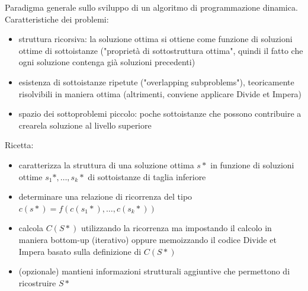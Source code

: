 Paradigma generale sullo sviluppo di un algoritmo di programmazione dinamica. Caratteristiche dei problemi:
\begin{itemize}
    \item struttura ricorsiva: la soluzione ottima si ottiene come funzione di soluzioni ottime di sottoistanze ("proprietà di sottostruttura ottima", quindi il fatto che ogni soluzione contenga già soluzioni precedenti)
    \item esistenza di sottoistanze ripetute ("overlapping subproblems"), teoricamente risolvibili in maniera ottima (altrimenti, conviene applicare Divide et Impera)
    \item spazio dei sottoproblemi piccolo: poche sottoistanze che possono contribuire a crearela soluzione al livello superiore
\end{itemize}

Ricetta:
\begin{itemize}
    \item caratterizza la struttura di una soluzione ottima $s*$ in funzione di soluzioni ottime $s_1*, \ldots, s_k*$ di sottoistanze di taglia inferiore
    \item determinare una relazione di ricorrenza del tipo $c(s*) = f(c(s_1*), \ldots, c(s_k*))$
    \item calcola $C(S*)$ utilizzando la ricorrenza ma impostando il calcolo in maniera bottom-up (iterativo) oppure memoizzando il codice Divide et Impera basato sulla definizione di $C(S*)$
    \item (opzionale) mantieni informazioni strutturali aggiuntive che permettono di ricostruire $S*$
\end{itemize}